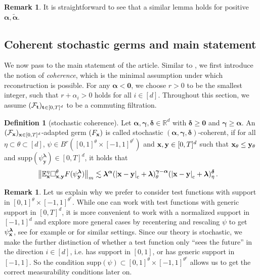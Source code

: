 \documentclass[12pt]{article}
\numberwithin{equation}{section}
\theoremstyle{plain}
\theoremstyle{definition}
\newtheorem{definition}[theorem]{Definition}
\newtheorem{remark}[theorem]{Remark}
\newcommand{\compAbs}[1]{\left\vert#1\right\vert_{\text{c}}}
\newcommand{\norm}[1]{\left\Vert #1\right\Vert}
\newcommand{\R}{\ensuremath{{\mathbb R}}}
\def\bE{\mathbb{E}}\def\bW{\mathbb{W}}
\def\fy{\mathbf y}\def\fz{\mathbf z}
\def\falpha{{\boldsymbol\alpha}}
\def\fgamma{{\boldsymbol\gamma}}
\def\fdelta{{\boldsymbol\delta}}
\def\flambda{{\boldsymbol\lambda}}
\def\foo{{\boldsymbol 0}}
\def\supp{\mbox{supp}}
\begin{document}
\begin{remark}\label{rem:sumCAlpha}
    It is straightforward to see that a similar lemma holds for positive $\falpha,\tilde\falpha$. 
\end{remark}


\subsection{Coherent stochastic germs and main statement}

We now pass to the main statement of the article. Similar to \cite{zambotti2020, kern2021}, we first introduce the notion of \emph{coherence}, which is the minimal assumption under which reconstruction is possible. For any $\falpha<\foo$, we choose $r>0$ to be the smallest integer, such that $r+\alpha_i > 0$ holds for all $i\in[d]$. Throughout this section, we assume $(\mathcal{F}_\mathbf t)_{\mathbf t\in[0,T]^d}$ to be a commuting filtration.

\begin{definition}[stochastic coherence]\label{def:extendedCoherence}
Let $\falpha,\fgamma,\fdelta\in\R^d$ with $\fdelta \ge \foo$ and $\fgamma\ge\falpha$. An $(\mathcal F_\mathbf x)_{\mathbf x\in[0,T]^d}$-adapted germ $(F_\mathbf x)$ is called stochastic $(\falpha,\fgamma,\fdelta)$-coherent, if for all $\eta\subset\theta\subset[d]$, $\psi\in B^{r}([0,1]^\theta\times[-1,1]^{\theta^c})$ and $\fx,\fy\in [0,T]^d$ such that $\fx_\theta\le \fy_\theta$ and $\supp(\psi_\fy^\flambda)\in[0,T]^d$, it holds that
%
\begin{align}\label{ineq:coherence}
    \norm{\bE^\eta_\fx \square^\theta_{\fx,\fy} F(\psi_\fy^{\flambda})}_m &\lesssim \flambda^{\falpha}(\compAbs{\fx-\fy}+\flambda)^{\fgamma-\falpha}_{\theta}(\compAbs{\fx-\fy}+\flambda)^{\fdelta}_{\eta}\,.
\end{align}
\end{definition}

\begin{remark}
Let us explain why we prefer to consider test functions with support in $[0,1]^\theta\times[-1,1]^{\theta^c}$. While one can work with test functions with generic support in $[0,T]^d$, it is more convenient to work with a normalized support in $[-1,1]^d$ and explore more general cases by recentering and rescaling $\psi$ to get $\psi_\fx^\flambda$, see for example \cite{zambotti2020} or \cite{Hairer2014} for similar settings. Since our theory is stochastic, we make the further distinction of whether a test function only ``sees the future'' in the direction $i\in[d]$, i.e. has support in $[0,1]$, or has generic support in $[-1,1]$. So the condition $\supp(\psi)\subset [0,1]^\theta\times[-1,1]^{\theta^c}$ allows us to get the correct measurability conditions later on.
\end{remark}
\end{document}
